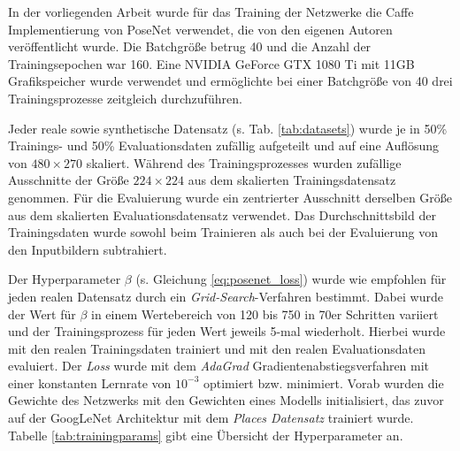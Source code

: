

In der vorliegenden Arbeit wurde für das Training der Netzwerke die Caffe \cite{jiaCaffeConvolutionalArchitecture2014} Implementierung von PoseNet verwendet, die von den eigenen Autoren \citet{kendallPoseNetConvolutionalNetwork2015} veröffentlicht wurde. Die Batchgröße betrug 40 und die Anzahl der Trainingsepochen war 160. Eine NVIDIA GeForce GTX 1080 Ti mit 11GB Grafikspeicher wurde verwendet und ermöglichte bei einer Batchgröße von 40 drei Trainingsprozesse zeitgleich durchzuführen.

Jeder reale sowie synthetische Datensatz (s. Tab. \ref{tab:datasets}) wurde je in 50\% Trainings- und 50\% Evaluationsdaten zufällig aufgeteilt und auf eine Auflösung von $480\times270$ skaliert. Während des Trainingsprozesses wurden zufällige Ausschnitte der Größe $224 \times 224$ aus dem skalierten Trainingsdatensatz genommen. Für die Evaluierung wurde ein zentrierter Ausschnitt derselben Größe aus dem skalierten Evaluationsdatensatz verwendet. Das Durchschnittsbild der Trainingsdaten wurde sowohl beim Trainieren als auch bei der Evaluierung von den Inputbildern subtrahiert. 

Der Hyperparameter $\beta$ (s. Gleichung \ref{eq:posenet_loss}) wurde wie empfohlen für jeden realen Datensatz durch ein \textit{Grid-Search}-Verfahren bestimmt. Dabei wurde der Wert für $\beta$ in einem Wertebereich von 120 bis 750 in 70er Schritten variiert und der Trainingsprozess für jeden Wert jeweils 5-mal wiederholt. Hierbei wurde mit den realen Trainingsdaten trainiert und mit den realen Evaluationsdaten evaluiert. Der \textit{Loss} wurde mit dem \textit{AdaGrad} \cite{duchiAdaptiveSubgradientMethods2011} Gradientenabstiegsverfahren mit einer konstanten Lernrate von $10^{-3}$ optimiert bzw. minimiert. Vorab wurden die Gewichte des Netzwerks mit den Gewichten eines Modells initialisiert, das zuvor auf der GoogLeNet Architektur mit dem \textit{Places Datensatz} trainiert wurde. Tabelle \ref{tab:trainingparams} gibt eine Übersicht der Hyperparameter an.

